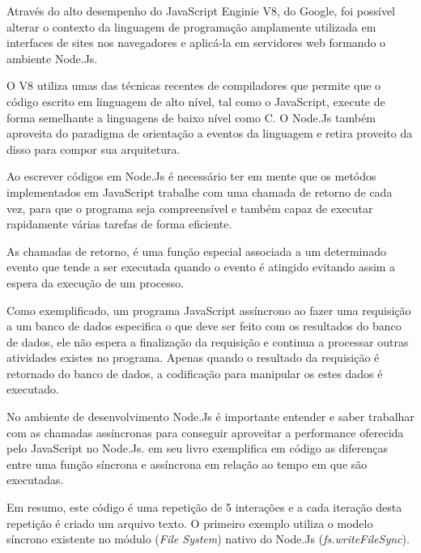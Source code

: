   Através do alto desempenho do JavaScript Enginie V8, do Google, foi possível alterar o contexto da linguagem de programação
  amplamente utilizada em interfaces de sites nos navegadores e aplicá-la em servidores web formando o ambiente Node.Js.
    
  O V8 utiliza umas das técnicas recentes de compiladores que permite que o código escrito em linguagem de alto nível,
  tal como o JavaScript, execute de forma semelhante a linguagens de baixo nível como C. O Node.Js também aproveita
  do paradigma de orientação a eventos da linguagem e retira proveito da disso para compor sua arquitetura.

  Ao escrever códigos em Node.Js é necessário ter em mente que os metódos implementados em JavaScript trabalhe com uma 
  chamada de retorno de cada vez, para que o programa seja compreensível e também capaz de executar rapidamente várias 
  tarefas de forma eficiente.\cite{Hughes:2012}

  As chamadas de retorno, é uma função especial associada a um determinado evento que tende a ser executada quando o evento
  é atingido evitando assim a espera da execução de um processo. 
  
  Como exemplificado, um programa JavaScript assíncrono ao fazer uma requisição 
  a um banco de dados especifica o que deve ser feito com os resultados do banco de dados, ele não espera a 
  finalização da requisição e continua a processar outras atividades existes no programa. 
  Apenas quando o resultado da requisição é retornado do banco de dados, a codificação para manipular os estes dados 
  é executado. \cite[p. 2]{Junior:2012}
  
  No ambiente de desenvolvimento Node.Js é importante entender e saber trabalhar com as chamadas assíncronas para conseguir
  aproveitar a performance oferecida pelo JavaScript no Node.Js.\cite{Pereira:2013} em seu livro exemplifica em código
  as diferenças entre uma função síncrona e assíncrona em relação ao tempo em que são executadas. 
  
  Em resumo, este código é uma repetição de 5 interações e a cada iteração desta repetição é criado um arquivo texto. O primeiro
  exemplo utiliza o modelo síncrono existente no módulo (\textit{File System}) nativo do Node.Js (\textit{fs.writeFileSync}).
  
